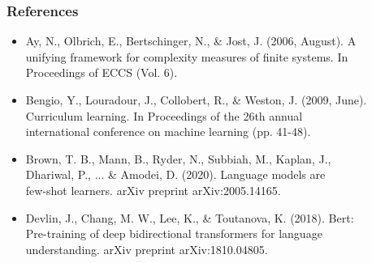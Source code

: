 \documentclass{beamer}
\begin{document}
\begin{frame}
	\frametitle{References}
	\begin{itemize}
		\item Ay, N., Olbrich, E., Bertschinger, N., \& Jost, J. (2006, August). A\\\hspace{1cm}unifying framework for
		complexity measures of finite systems. In\\\hspace{1cm}Proceedings of ECCS (Vol. 6).
		\item Bengio, Y., Louradour, J., Collobert, R., \& Weston, J. (2009, June).\\\hspace{1cm}Curriculum learning. In
		Proceedings of the 26th annual \\\hspace{1cm}international conference on machine learning (pp.
		41-48).
		\item Brown, T. B., Mann, B., Ryder, N., Subbiah, M., Kaplan, J., \\\hspace{1cm}Dhariwal, P., ... \& Amodei, D.
		(2020). Language models are\\\hspace{1cm}few-shot learners. arXiv preprint arXiv:2005.14165.
		\item Devlin, J., Chang, M. W., Lee, K., \& Toutanova, K. (2018). Bert: \\\hspace{1cm}Pre-training of deep
		bidirectional transformers for language\\\hspace{1cm} understanding. arXiv preprint
		arXiv:1810.04805.
	\end{itemize}
\end{frame}
\end{document}
